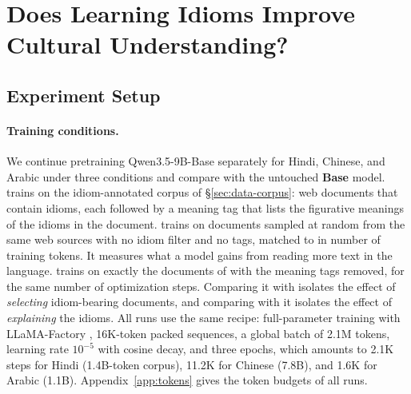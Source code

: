 \section{Does Learning Idioms Improve Cultural Understanding?}
\label{sec:experiments}

\subsection{Experiment Setup}
\label{sec:setup}

\paragraph{Training conditions.}
We continue pretraining Qwen3.5-9B-Base \citep{yang2025qwen3}  separately for Hindi, Chinese, and Arabic under three conditions and compare with the untouched \textbf{Base} model.
\textbf{\idiomcpt{}} trains on the idiom-annotated corpus of \S\ref{sec:data-corpus}: web documents that contain \dataname{} idioms, each followed by a meaning tag that lists the figurative meanings of the idioms in the document.
\textbf{\random{}} trains on documents sampled at random from the same web sources with no idiom filter and no tags, matched to \idiomcpt{} in number of training tokens. It measures what a model gains from reading more text in the language.
\textbf{\idiomdocs{}} trains on exactly the documents of \idiomcpt{} with the meaning tags removed, for the same number of optimization steps. Comparing it with \random{} isolates the effect of \textit{selecting} idiom-bearing documents, and comparing \idiomcpt{} with it isolates the effect of \textit{explaining} the idioms.
All runs use the same recipe: full-parameter training with LLaMA-Factory \citep{zheng2024llamafactory}, 16K-token packed sequences, a global batch of 2.1M tokens, learning rate $10^{-5}$ with cosine decay, and three epochs, which amounts to 2.1K steps for Hindi (1.4B-token corpus), 11.2K for Chinese (7.8B), and 1.6K for Arabic (1.1B). Appendix~\ref{app:tokens} gives the token budgets of all runs.

